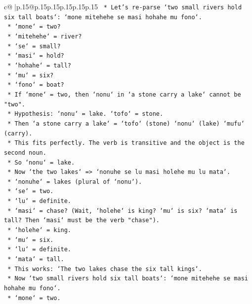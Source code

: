 \documentclass{article}
\begin{document}
{\begin{supertabular}{c@{$\;$}|p{.15\linewidth}@{}p{.15\linewidth}p{.15\linewidth}p{.15\linewidth}p{.15\linewidth}p{.15\linewidth}}
{{{\texttt{        *   Let's re{-}parse `two small rivers hold six tall boats`: `mone mitehehe se masi hohahe mu fono`.} \\
\texttt{            *   `mone` = two?} \\
\texttt{            *   `mitehehe` = river?} \\
\texttt{            *   `se` = small?} \\
\texttt{            *   `masi` = hold?} \\
\texttt{            *   `hohahe` = tall?} \\
\texttt{            *   `mu` = six?} \\
\texttt{            *   `fono` = boat?} \\
\texttt{        *   If `mone` = two, then `nonu` in `a stone carry a lake` cannot be "two".} \\
\texttt{        *   Hypothesis: `nonu` = lake. `tofo` = stone.} \\
\texttt{        *   Then `a stone carry a lake` = `tofo` (stone) `nonu` (lake) `mufu` (carry).} \\
\texttt{        *   This fits perfectly. The verb is transitive and the object is the second noun.} \\
\texttt{        *   So `nonu` = lake.} \\
\texttt{        *   Now `the two lakes` => `nonuhe se lu masi holehe mu lu mata`.} \\
\texttt{            *   `nonuhe` = lakes (plural of `nonu`).} \\
\texttt{            *   `se` = two.} \\
\texttt{            *   `lu` = definite.} \\
\texttt{            *   `masi` = chase? (Wait, `holehe` is king? `mu` is six? `mata` is tall? Then `masi` must be the verb "chase").} \\
\texttt{            *   `holehe` = king.} \\
\texttt{            *   `mu` = six.} \\
\texttt{            *   `lu` = definite.} \\
\texttt{            *   `mata` = tall.} \\
\texttt{            *   This works: `The two lakes chase the six tall kings`.} \\
\texttt{        *   Now `two small rivers hold six tall boats`: `mone mitehehe se masi hohahe mu fono`.} \\
\texttt{            *   `mone` = two.} \\
}}}
\end{supertabular}}
\end{document}
